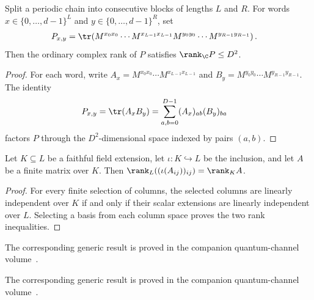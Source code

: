 \begin{lemma}
    \label{thm:mpo_diagonal_cut_rank}
    \leanok
    Split a periodic chain into consecutive blocks of lengths $L$ and $R$.
    For words $x\in\{0,\ldots,d-1\}^L$ and
    $y\in\{0,\ldots,d-1\}^R$, set
    \begin{align}
        P_{x,y}
         & =
        \tr\!\left(M^{x_0x_0}\cdots M^{x_{L-1}x_{L-1}}
        M^{y_0y_0}\cdots M^{y_{R-1}y_{R-1}}\right).
        \notag
    \end{align}
    Then the ordinary complex rank of $P$ satisfies
    $\rank_{\C}P\le D^2$.
\end{lemma}
\begin{proof}\leanok
    For each word, write
    $A_x=M^{x_0x_0}\cdots M^{x_{L-1}x_{L-1}}$ and
    $B_y=M^{y_0y_0}\cdots M^{y_{R-1}y_{R-1}}$. The identity
    \begin{align}
        P_{x,y}
         & =\tr(A_xB_y)
        =\sum_{a,b=0}^{D-1}(A_x)_{ab}(B_y)_{ba}
        \notag
    \end{align}
    factors $P$ through the $D^2$-dimensional space indexed by pairs $(a,b)$.
\end{proof}

\begin{lemma}
    \label{thm:matrix_rank_scalar_extension}
    \leanok
    Let $K\subseteq L$ be a faithful field extension, let
    $\iota:K\hookrightarrow L$ be the inclusion, and let $A$ be a finite
    matrix over $K$. Then
    $\rank_{L}\!\left((\iota(A_{ij}))_{ij}\right)=\rank_{K}A$.
\end{lemma}
\begin{proof}\leanok
    For every finite selection of columns, the selected columns are linearly
    independent over $K$ if and only if their scalar extensions are linearly
    independent over $L$. Selecting a basis from each column space proves the
    two rank inequalities.
\end{proof}


The corresponding generic result is proved in the companion quantum-channel volume~\cite[``Joint probability distribution and marginals'']{QICLean2026Blueprint}.



The corresponding generic result is proved in the companion quantum-channel volume~\cite[``Entropy and classical mutual information'']{QICLean2026Blueprint}.



